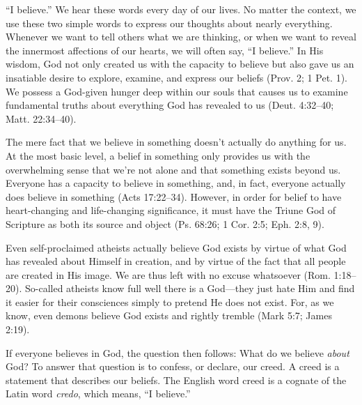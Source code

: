 “I believe.” We hear these words every day of our lives. No matter the context, we use these two simple words to express our thoughts about nearly everything. Whenever we want to tell others what we are thinking, or when we want to reveal the innermost affections of our hearts, we will often say, “I believe.” In His wisdom, God not only created us with the capacity to believe but also gave us an insatiable desire to explore, examine, and express our beliefs (Prov. 2; 1 Pet. 1). We possess a God-given hunger deep within our souls that causes us to examine fundamental truths about everything God has revealed to us (Deut. 4:32–40; Matt. 22:34–40).

\medskip

The mere fact that we believe in something doesn’t actually do anything for us. At the most basic level, a belief in something only provides us with the overwhelming sense that we’re not alone and that something exists beyond us. Everyone has a capacity to believe in something, and, in fact, everyone actually does believe in something (Acts 17:22–34). However, in order for belief to have heart-changing and life-changing significance, it must have the Triune God of Scripture as both its source and object (Ps. 68:26; 1 Cor. 2:5; Eph. 2:8, 9).

\medskip

Even self-proclaimed atheists actually believe God exists by virtue of what God has revealed about Himself in creation, and by virtue of the fact that all people are created in His image. We are thus left with no excuse whatsoever (Rom. 1:18–20). So-called atheists know full well there is a God—they just hate Him and find it easier for their consciences simply to pretend He does not exist. For, as we know, even demons believe God exists and rightly tremble (Mark 5:7; James 2:19).

\medskip

If everyone believes in God, the question then follows: What do we believe \textit{about} God? To answer that question is to confess, or declare, our creed. A creed is a statement that describes our beliefs. The English word creed is a cognate of the Latin word \textit{credo}, which means, “I believe.”

\medskip

